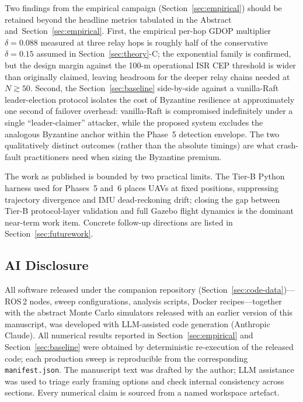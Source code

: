\documentclass[journal,10pt,twocolumn]{IEEEtran}
\begin{document}
Two findings from the empirical campaign (Section~\ref{sec:empirical}) should be retained beyond the headline metrics tabulated in the Abstract and~Section~\ref{sec:empirical}. First, the empirical per-hop GDOP multiplier $\delta=0.088$ measured at three relay hops is roughly half of the conservative $\delta=0.15$ assumed in Section~\ref{sec:theory}-C; the exponential family is confirmed, but the design margin against the 100-m operational ISR CEP threshold is wider than originally claimed, leaving headroom for the deeper relay chains needed at $N\gtrsim 50$. Second, the Section~\ref{sec:baseline} side-by-side against a vanilla-Raft leader-election protocol isolates the cost of Byzantine resilience at approximately one second of failover overhead: vanilla-Raft is compromised indefinitely under a single ``leader-claimer'' attacker, while the proposed system excludes the analogous Byzantine anchor within the Phase~5 detection envelope. The two qualitatively distinct outcomes (rather than the absolute timings) are what crash-fault practitioners need when sizing the Byzantine premium.

The work as published is bounded by two practical limits. The Tier-B Python harness used for Phases~5 and~6 places UAVs at fixed positions, suppressing trajectory divergence and IMU dead-reckoning drift; closing the gap between Tier-B protocol-layer validation and full Gazebo flight dynamics is the dominant near-term work item. Concrete follow-up directions are listed in Section~\ref{sec:futurework}.

\subsection*{AI Disclosure}
All software released under the companion repository (Section~\ref{sec:code-data})---ROS\,2 nodes, sweep configurations, analysis scripts, Docker recipes---together with the abstract Monte Carlo simulators released with an earlier version of this manuscript, was developed with LLM-assisted code generation (Anthropic Claude). All numerical results reported in Section~\ref{sec:empirical} and Section~\ref{sec:baseline} were obtained by deterministic re-execution of the released code; each production sweep is reproducible from the corresponding \texttt{manifest.json}. The manuscript text was drafted by the author; LLM assistance was used to triage early framing options and check internal consistency across sections. Every numerical claim is sourced from a named workspace artefact.
\end{document}
